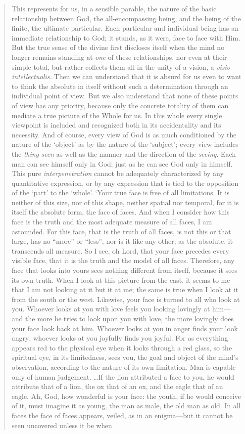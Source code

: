 \begin{quote}
    This represents for us, in a sensible parable, the nature of the basic relationship between God, the all-encompassing being, and the being of the finite, the ultimate particular.  Each particular and individual being has an immediate relationship to God; it stands, as it were, face to face with Him.  But the true sense of the divine first discloses itself when the mind no longer remains standing at \emph{one} of these relationships, nor even at their simple total, but rather collects them all in the unity of a vision, a \emph{visio intellectualis.}  Then we can understand that it is absurd for us even to want to think the absolute in itself without such a determination through an individual point of view.  But we also understand that none of these points of view has any priority, because only the concrete totality of them can mediate a true picture of the Whole for us.  In this whole every single viewpoint is included and recognized both in its accidentality and its necessity.  And of course, every view of God is as much conditioned by the nature of the `object' as by the nature of the `subject'; every view includes the \emph{thing seen} as well as the manner and the direction of the \emph{seeing}.  Each man can see himself only in God; just as he can see God only in himself.  This pure \emph{interpenetration} cannot be adequately characterized by any quantitative expression, or by any expression that is tied to the opposition of the `part' to the `whole'.  `Your true face is free of all limitations.  It is neither of this size, nor of this shape, neither spatial nor temporal, for it is itself the absolute form, the face of faces.  And when I consider how this face is the truth and the most adequate measure of all faces, I am astounded.  For this face, that is the truth of all faces, is not this or that large, has no ``more'' or ``less'', nor is it like any other; as the absolute, it transcends all measure.  So I see, oh Lord, that your face precedes every visible face, that it is the truth and the model of all faces.  Therefore, any face that looks into yours sees nothing different from itself, because it sees its own truth.  When I look at this picture from the east, it seems to me that I am not looking at it but it at me; the same is true when I look at it from the south or the west.  Likewise, your face is turned to all who look at you.  Whoever looks at you with love feels you looking lovingly at him---and the more he tries to look upon you with love, the more lovingly does your face look back at him.  Whoever looks at you in anger finds your look angry; whoever looks at you joyfully finds you joyful.  For as everything appears red to the physical eye when it looks through a red glass, so the spiritual eye, in its limitedness, sees you, the goal and object of the mind's observation, according to the nature of its own limitation.  Man is capable only of human judgement.  \dots If the lion attributed a face to you, he would attribute that of a lion, the ox that of an ox, and the eagle that of an eagle.  Ah, God, how wonderful is your face: the youth, if he would conceive of it, must imagine it as young, the man as male, the old man as old.  In all faces the face of faces appears, veiled, as in an enigma---but it cannot be seen uncovered unless it be when 
\end{quote}
